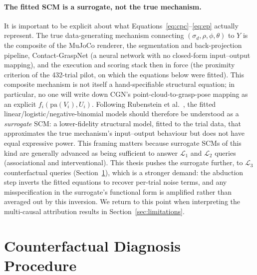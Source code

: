 \documentclass[11pt,a4paper]{report}
\begin{document}
\paragraph{The fitted SCM is a surrogate, not the true mechanism.} It is important to be explicit about what Equations~\eqref{eq:cpc}--\eqref{eq:ep} actually represent. The true data-generating mechanism connecting $(\sigma_d, \rho, \phi, \theta)$ to $Y$ is the composite of the MuJoCo renderer, the segmentation and back-projection pipeline, Contact-GraspNet (a neural network with no closed-form input--output mapping), and the execution and scoring stack then in force (the proximity criterion of the 432-trial pilot, on which the equations below were fitted). This composite mechanism is not itself a hand-specifiable structural equation; in particular, no one will write down CGN's point-cloud-to-grasp-pose mapping as an explicit $f_i(\text{pa}(V_i), U_i)$. Following Rubenstein et al.~\cite{rubenstein2017consistency}, the fitted linear/logistic/negative-binomial models should therefore be understood as a \emph{surrogate} SCM: a lower-fidelity structural model, fitted to the trial data, that approximates the true mechanism's input--output behaviour but does not have equal expressive power. This framing matters because surrogate SCMs of this kind are generally advanced as being sufficient to answer $\mathcal{L}_1$ and $\mathcal{L}_2$ queries (associational and interventional). This thesis pushes the surrogate further, to $\mathcal{L}_3$ counterfactual queries (Section~\ref{sec:counterfactual_diagnosis}), which is a stronger demand: the abduction step inverts the fitted equations to recover per-trial noise terms, and any misspecification in the surrogate's functional form is amplified rather than averaged out by this inversion. We return to this point when interpreting the multi-causal attribution results in Section~\ref{sec:limitations}.

\section{Counterfactual Diagnosis Procedure}
\label{sec:counterfactual_diagnosis}
\end{document}
